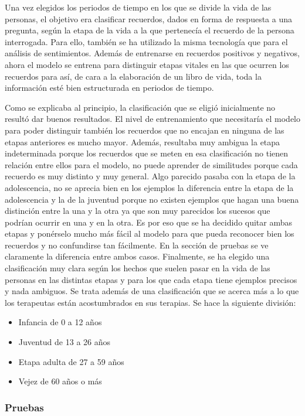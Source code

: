 Una vez elegidos los periodos de tiempo en los que se divide la vida de las personas, el objetivo era clasificar recuerdos, dados en forma de respuesta a una pregunta, según la etapa de la vida a la que pertenecía el recuerdo de la persona interrogada. Para ello, también se ha utilizado la misma tecnología que para el análisis de sentimientos. Además de entrenarse en recuerdos positivos y negativos, ahora el modelo se entrena para distinguir etapas vitales en las que ocurren los recuerdos para así, de cara a la elaboración de un libro de vida, toda la información esté bien estructurada en periodos de tiempo. 

Como se explicaba al principio, la clasificación que se eligió inicialmente no resultó dar buenos resultados. El nivel de entrenamiento que necesitaría el modelo para poder distinguir también los recuerdos que no encajan en ninguna de las etapas anteriores es mucho mayor. Además, resultaba muy ambigua la etapa indeterminada porque los recuerdos que se meten en esa clasificación no tienen relación entre ellos para el modelo, no puede aprender de similitudes porque cada recuerdo es muy distinto y muy general. Algo parecido pasaba con la etapa de la adolescencia, no se aprecia bien en los ejemplos la diferencia entre la etapa de la adolescencia y la de la juventud porque no existen ejemplos que hagan una buena distinción entre la una y la otra ya que son muy parecidos los sucesos que podrían ocurrir en una y en la otra. Es por eso que se ha decidido quitar ambas etapas y ponérselo mucho más fácil al modelo para que pueda reconocer bien los recuerdos y no confundirse tan fácilmente. En la sección de pruebas se ve claramente la diferencia entre ambos casos. Finalmente, se ha elegido una  clasificación muy clara según los hechos que suelen pasar en la vida de las personas en las distintas etapas y para los que cada etapa tiene ejemplos precisos y nada ambiguos. Se trata además de una clasificación que se acerca más a lo que los terapeutas están acostumbrados en sus terapias. Se hace la siguiente división:

\begin{itemize}
	\item Infancia de 0 a 12 años
	\item Juventud de 13 a 26 años
	\item Etapa adulta de 27 a 59 años
	\item Vejez de 60 años o más
\end{itemize}


\subsubsection{Pruebas}

